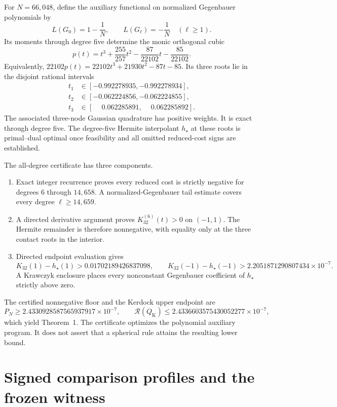 \documentclass[11pt]{article}
\begin{document}
For $N=66{,}048$, define the auxiliary functional on normalized
Gegenbauer polynomials by
\[
L(G_0)=1-\frac1N,
\qquad
L(G_\ell)=-\frac1N\quad(\ell\ge1).
\]
Its moments through degree five determine the monic orthogonal cubic
\[
p(t)=t^3+\frac{255}{257}t^2-\frac{87}{22102}t-
\frac{85}{22102}.
\]
Equivalently, $22102p(t)=22102t^3+21930t^2-87t-85$. Its three roots lie
in the disjoint rational intervals
\[
\begin{split}
 t_1&\in[-0.992278935,-0.992278934],\\
 t_2&\in[-0.062224856,-0.062224855],\\
 t_3&\in[\phantom{-}0.062285891,\phantom{-}0.062285892].
\end{split}
\]
The associated three-node Gaussian quadrature has positive weights. It is
exact through degree five. The degree-five Hermite interpolant $h_\star$ at
these roots is primal--dual optimal once feasibility and all omitted
reduced-cost signs are established.

The all-degree certificate has three components.

\begin{enumerate}
\item Exact integer recurrence proves every reduced cost is strictly negative
for degrees $6$ through $14{,}658$. A normalized-Gegenbauer tail estimate
covers every degree $\ell\ge14{,}659$.
\item A directed derivative argument proves $K_{32}^{(6)}(t)>0$ on
$(-1,1)$. The Hermite remainder is therefore nonnegative, with equality only
at the three contact roots in the interior.
\item Directed endpoint evaluation gives
\[
K_{32}(1)-h_\star(1)>0.01702189426837098,
\qquad
K_{32}(-1)-h_\star(-1)>2.2051871290807434\times10^{-7}.
\]
A Krawczyk enclosure places every nonconstant Gegenbauer coefficient of
$h_\star$ strictly above zero.
\end{enumerate}

The certified nonnegative floor and the Kerdock upper endpoint are
\[
P_N\ge2.4330928587565937917\times10^{-7},
\qquad
\mathcal R(Q_{\mathrm K})\le2.4336603575430052277\times10^{-7},
\]
which yield Theorem~1. The certificate optimizes the polynomial auxiliary program. It does not
assert that a spherical rule attains the resulting lower bound.

\section{Signed comparison profiles and the frozen witness}\label{app:signed}
\end{document}
